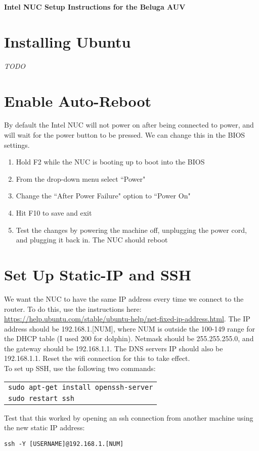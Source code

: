 \documentclass{article}
\newcommand{\todo}{ \begin{center} \large \emph{TODO} \end{center}}
\begin{document}
\begin{center}
\Large\bf Intel NUC Setup Instructions for the Beluga AUV
\end{center}

\section*{Installing Ubuntu}
\todo

\section*{Enable Auto-Reboot}
By default the Intel NUC will not power on after being connected to power, and will wait for the power button to be pressed.
We can change this in the BIOS settings.
\begin{enumerate}[nosep]
\item Hold F2 while the NUC is booting up to boot into the BIOS
\item From the drop-down menu select ``Power"
\item Change the ``After Power Failure" option to ``Power On"
\item Hit F10 to save and exit
\item Test the changes by powering the machine off, unplugging the power cord, and plugging it back in. The NUC should reboot
\end{enumerate}

\section*{Set Up Static-IP and SSH}
We want the NUC to have the same IP address every time we connect to the router.
To do this, use the instructions here: \url{https://help.ubuntu.com/stable/ubuntu-help/net-fixed-ip-address.html}.
The IP address should be 192.168.1.[NUM], where NUM is outside the 100-149 range for the DHCP table (I used 200 for dolphin).
Netmask should be 255.255.255.0, and the gateway should be 192.168.1.1.
The DNS servers IP should also be 192.168.1.1.
Reset the wifi connection for this to take effect.\\

To set up SSH, use the following two commands:
\begin{center}
\begin{tabular}{l}
\texttt{sudo apt-get install openssh-server} \\
\texttt{sudo restart ssh}
\end{tabular}
\end{center}
Test that this worked by opening an ssh connection from another machine using the new static IP address:
\begin{center}
\texttt{ssh -Y [USERNAME]@192.168.1.[NUM]}
\end{center}
\end{document}

